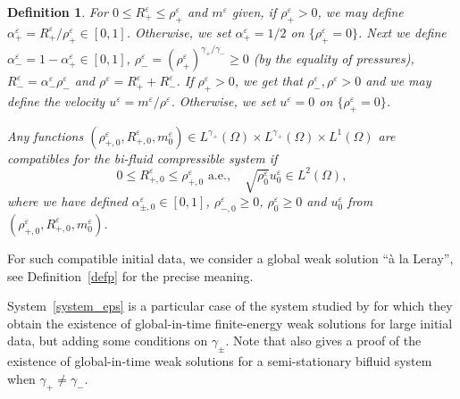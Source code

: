 \documentclass[11pt, twoside, a4paper]{article}
\theoremstyle{plain}
\newtheorem{definition}[theorem]{Definition}
\theoremstyle{remark}
\numberwithin{equation}{section}
\renewcommand{\leq}{\leqslant}\renewcommand{\le}{\leqslant}
\renewcommand{\geq}{\geqslant}\renewcommand{\ge}{\geqslant}
\renewcommand{\epsilon}{\varepsilon}
\newcommand{\eps}{\varepsilon}
\begin{document}
\begin{definition}\label{rem.compa}
 For $0\leq R_+^\eps \leq \rho_+^\eps$ and $m^\epsilon$ given, if $\rho_+^\eps>0$, we may define $\alpha_+^\eps=R_+^\eps/\rho_+^\eps\in [0,1]$. Otherwise, we set $\alpha_+^\eps=1/2$ on $\{\rho_+^\eps=0\}$. Next we define $\alpha_-^\eps=1-\alpha_+^\eps\in[0,1]$, $\rho_-^\eps =(\rho_+^\eps)^{\gamma_+/\gamma_-}\geq 0$ (by the equality of pressures), $R_-^\epsilon=\alpha_-^\eps \rho_-^\eps$ and $\rho^\eps = R_+^\eps+R_-^\epsilon$. If $\rho_+^\eps>0$, we get that $\rho_-^\eps,\rho^\eps>0$ and we may define the velocity $u^\eps = m^\eps/\rho^\eps$. Otherwise, we set $u^\eps=0$ on $\{\rho_+^\eps=0\}$.

Any functions $(\rho_{+,0}^\eps,R_{+,0}^\eps, m_0^\epsilon)\in L^{\gamma_+}(\Omega)\times L^{\gamma_+}(\Omega)\times L^{1}(\Omega)$ are compatibles for the bi-fluid compressible system if
\begin{equation}\label{compatibilityeps}
 0\leq R_{+,0}^\eps \leq \rho_{+,0}^\eps\text{\ a.e.}, \quad \sqrt{\rho_0^\eps} u_0^\eps\in L^2(\Omega),
\end{equation}
where we have defined $\alpha_{\pm,0}^\eps\in [0,1]$, $\rho_{-,0}^\eps\geq 0$, $\rho^\eps_0\geq 0$ and $u_0^\eps$ from $(\rho_{+,0}^\eps,R_{+,0}^\eps, m_0^\epsilon)$.
 \end{definition}
For such compatible initial data, we consider a global weak solution ``à la Leray'', see Definition~\ref{defp} for the precise meaning.

System~\eqref{system_eps} is a particular case of the system studied by \cite{novotny2020weak} for which they obtain the existence of global-in-time finite-energy weak solutions for large initial data, but adding some conditions on $\gamma_\pm$. Note that \cite{bresch2019finite} also gives a proof of the existence of global-in-time weak solutions for a semi-stationary bifluid system when $\gamma_+\neq \gamma_-$. 
\end{document}
